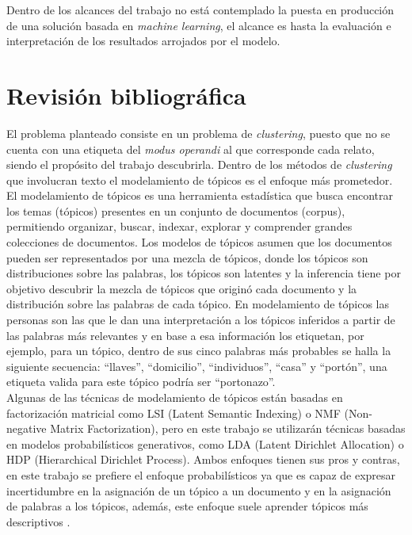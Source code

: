 \documentclass[letterpaper,12pt,oneside]{book} %
\begin{document}
Dentro de los alcances del trabajo no está contemplado la puesta en producción de una solución basada en \textit{machine learning}, el alcance es hasta la evaluación e interpretación de los resultados arrojados por el modelo.

\chapter{Revisión bibliográfica}

El problema planteado consiste en un problema de \textit{clustering}, puesto que no se cuenta con una etiqueta del \textit{modus operandi} al que corresponde cada relato, siendo el propósito del trabajo descubrirla. Dentro de los métodos de \textit{clustering} que involucran texto el modelamiento de tópicos es el enfoque más prometedor.%
El modelamiento de tópicos es una herramienta estadística que busca encontrar los temas (tópicos) presentes en un conjunto de documentos (corpus), permitiendo organizar, buscar, indexar, explorar y comprender grandes colecciones de documentos. %
Los modelos de tópicos asumen que los documentos pueden ser representados por una mezcla de tópicos, donde los tópicos son distribuciones sobre las palabras, los tópicos son latentes y la inferencia tiene por objetivo descubrir la mezcla de tópicos que originó cada documento y la distribución sobre las palabras de cada tópico. En modelamiento de tópicos las personas son las que le dan una interpretación a los tópicos inferidos a partir de las palabras más relevantes y en base a esa información los etiquetan, por ejemplo, para un tópico, dentro de sus cinco palabras más probables se halla la siguiente secuencia: ``llaves'', ``domicilio'', ``individuos'', ``casa'' y ``portón'', una etiqueta valida para este tópico podría ser ``portonazo''.\\

Algunas de las técnicas de modelamiento de tópicos están basadas en factorización matricial como LSI (Latent Semantic Indexing) \citep{dumais2004latent} o NMF (Non-negative Matrix Factorization)\citep{xu2003document}, pero en este trabajo se utilizarán técnicas basadas en modelos probabilísticos generativos, como LDA (Latent Dirichlet Allocation)\citep{blei2003latent} o HDP (Hierarchical Dirichlet Process)\citep{teh2005sharing}. Ambos enfoques tienen sus pros y contras, en este trabajo se prefiere el enfoque probabilísticos ya que es capaz de expresar incertidumbre en la asignación de un tópico a un documento y en la asignación de palabras a los tópicos, además, este enfoque suele aprender tópicos más descriptivos \citep{stevens2012exploring}.\\
\end{document}

